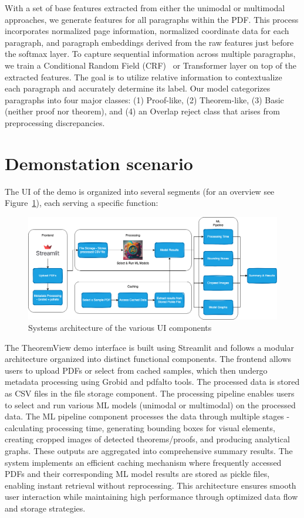 \documentclass[runningheads]{llncs}
\begin{document}
With a set of base features extracted from either the unimodal or multimodal approaches, we generate 
features for all paragraphs within the PDF. This process incorporates normalized page information, 
normalized coordinate data for each paragraph, and paragraph embeddings derived from the raw features 
just before the softmax layer. To capture sequential information across multiple paragraphs, we train a 
Conditional Random Field (CRF)~\cite{crf} or Transformer layer on top of the extracted features. The goal is to utilize 
relative information to contextualize each paragraph and accurately determine its label. Our model 
categorizes paragraphs into four major classes: (1) Proof-like, (2) Theorem-like, (3) Basic (neither 
proof nor theorem), and (4) an Overlap reject class that arises from preprocessing discrepancies.

\section{Demonstation scenario}

The UI of the demo is organized into several segments (for an overview see Figure~\ref{fig:system-arch}), each serving a specific function:

\begin{figure}[h]
    \centering
    \includegraphics[width=\textwidth]{images/sys-demo-arch.png}
    \caption{Systems architecture of the various UI components
    }
    \label{fig:system-arch}
\end{figure}

The TheoremView demo interface is built using Streamlit and follows a modular architecture organized into distinct functional components. The frontend allows users to upload PDFs or select from cached samples, which then undergo metadata processing using Grobid and pdfalto tools. The processed data is stored as CSV files in the file storage component. The processing pipeline enables users to select and run various ML models (unimodal or multimodal) on the processed data. The ML pipeline component processes the data through multiple stages - calculating processing time, generating bounding boxes for visual elements, creating cropped images of detected theorems/proofs, and producing analytical graphs. These outputs are aggregated into comprehensive summary results. The system implements an efficient caching mechanism where frequently accessed PDFs and their corresponding ML model results are stored as pickle files, enabling instant retrieval without reprocessing. This architecture ensures smooth user interaction while maintaining high performance through optimized data flow and storage strategies.
\end{document}
